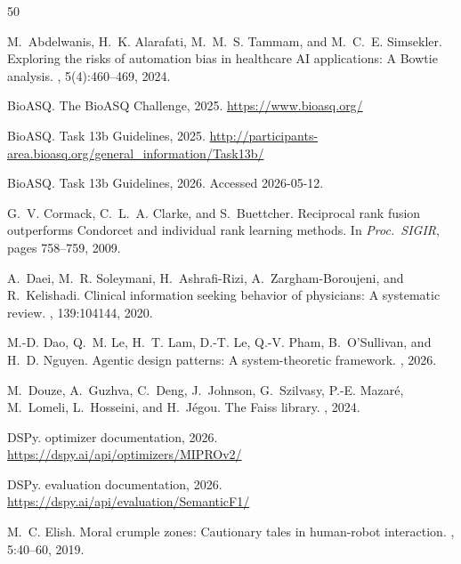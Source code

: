 \documentclass[sigconf,anonymous,review]{acmart}
\begin{document}

\begin{thebibliography}{50}

M.~Abdelwanis, H.~K. Alarafati, M.~M.~S. Tammam, and M.~C.~E. Simsekler.
\newblock Exploring the risks of automation bias in healthcare {AI} applications: {A} {B}owtie analysis.
, 5(4):460--469, 2024.

BioASQ.
\newblock The {BioASQ} Challenge, 2025.
\newblock \url{https://www.bioasq.org/}

BioASQ.
 Task 13b Guidelines, 2025.
\newblock \url{http://participants-area.bioasq.org/general_information/Task13b/}

BioASQ.
 Task 13b Guidelines, 2026.
\newblock Accessed 2026-05-12.

G.~V. Cormack, C.~L.~A. Clarke, and S.~Buettcher.
\newblock Reciprocal rank fusion outperforms {C}ondorcet and individual rank learning methods.
\newblock In {\em Proc.\ SIGIR}, pages 758--759, 2009.

A.~Daei, M.~R. Soleymani, H.~Ashrafi-Rizi, A.~Zargham-Boroujeni, and R.~Kelishadi.
\newblock Clinical information seeking behavior of physicians: {A} systematic review.
, 139:104144, 2020.

M.-D. Dao, Q.~M. Le, H.~T. Lam, D.-T. Le, Q.-V. Pham, B.~O'Sullivan, and H.~D. Nguyen.
\newblock Agentic design patterns: {A} system-theoretic framework.
, 2026.

M.~Douze, A.~Guzhva, C.~Deng, J.~Johnson, G.~Szilvasy, P.-E. Mazar\'{e}, M.~Lomeli, L.~Hosseini, and H.~J\'{e}gou.
\newblock The {Faiss} library.
, 2024.

DSPy.
 optimizer documentation, 2026.
\newblock \url{https://dspy.ai/api/optimizers/MIPROv2/}

DSPy.
 evaluation documentation, 2026.
\newblock \url{https://dspy.ai/api/evaluation/SemanticF1/}

M.~C. Elish.
\newblock Moral crumple zones: {C}autionary tales in human-robot interaction.
, 5:40--60, 2019.


\end{thebibliography}
\end{document}

